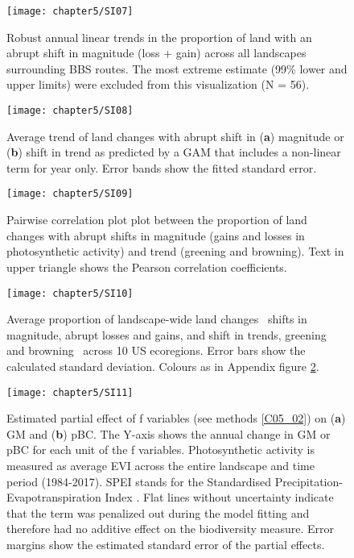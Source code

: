 \begin{figure}[htb]
\centering
\texttt{[image: chapter5/SI07]}
\caption{Robust annual linear trends in the proportion of land with an abrupt shift in magnitude (loss + gain) across all landscapes surrounding BBS routes. The most extreme estimate (99\% lower and upper limits) were excluded from this visualization (N = 56). }
\label{SI05_07}
\end{figure}

\begin{figure}[htb]
\centering
\texttt{[image: chapter5/SI08]}
\caption{Average trend of land changes with abrupt shift in (\textbf{a}) magnitude or (\textbf{b}) shift in trend as predicted by a GAM that includes a non-linear term for year only. Error bands show the fitted standard error.}
\label{SI05_08}
\end{figure}

\begin{figure}[htb]
\centering
\texttt{[image: chapter5/SI09]}
\caption{Pairwise correlation plot plot between the proportion of land changes with abrupt shifts in magnitude (gains and losses in photosynthetic activity) and trend (greening and browning). Text in upper triangle shows the Pearson correlation coefficients.}
\label{SI05_09}
\end{figure}

\begin{figure}[htb]
\centering
\texttt{[image: chapter5/SI10]}
\caption{Average proportion of landscape-wide land changes \textendash\ shifts in magnitude, \eg abrupt losses and gains, and shift in trends, \eg greening and browning \textendash\ across 10 US ecoregions. Error bars show the calculated standard deviation. Colours as in Appendix figure \ref{SI05_08}.}
\label{SI05_10}
\end{figure}

\begin{figure}[htb]
\centering
\texttt{[image: chapter5/SI11]}
\caption{Estimated partial effect of f variables (see methods \ref{C05_02}) on (\textbf{a}) GM and (\textbf{b}) pBC. The Y-axis shows the annual change in GM or pBC for each unit of the f variables. Photosynthetic activity is measured as average EVI across the entire landscape and time period (1984-2017). SPEI stands for the Standardised Precipitation-Evapotranspiration Index \citep{Vicente-Serrano2010}. Flat lines without uncertainty indicate that the term was penalized out during the model fitting and therefore had no additive effect on the biodiversity measure. Error margins show the estimated standard error of the partial effects.
}
\label{SI05_11}
\end{figure}


